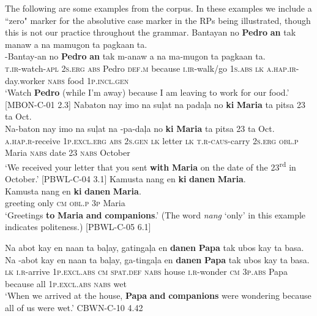  The following are some examples from the corpus. In these examples we include a ``zero" marker for the absolutive case marker in the RPs being illustrated, though this is not our practice throughout the grammar. 
\ea
Bantayan  no  \textbf{Pedro}  \textbf{an}  tak  manaw a  na  mamugon  ta  pagkaan  ta. \\\smallskip
 \gll \emptyset{}-Bantay-an  no   \emptyset {} \textbf{Pedro}  \textbf{an}  tak  m-anaw a  na  ma-mugon  ta  pagkaan  ta. \\
\textsc{t.ir}-watch-\textsc{apl}  2\textsc{s.erg}  \textsc{abs}  Pedro  \textsc{def.m}  because  \textsc{i.ir}-walk/go 1\textsc{s.abs}  \textsc{lk}  \textsc{a.hap.ir}-day.worker  \textsc{nabs}  food  1\textsc{p.incl.gen} \\
\glt `Watch \textbf{Pedro} (while I’m away) because I am leaving to work for our food.’ [MBON-C-01 2.3]
\z
\ea
Nabaton  nay imo  na  suļat  na  padaļa  no \textbf{ki}  \textbf{Maria}  ta  pitsa  23  ta  Oct. \\\smallskip
 \gll Na-baton  nay \emptyset{} imo  na  suļat  na  \emptyset{}-pa-daļa  no \textbf{ki}  \textbf{Maria}  ta  pitsa  23  ta  Oct. \\
\textsc{a.hap.r}-receive  1\textsc{p.excl.erg} \textsc{abs} 2\textsc{s.gen}  \textsc{lk}  letter  \textsc{lk}  \textsc{t.r-caus-}carry  2\textsc{s.erg} \textsc{obl.p}  Maria  \textsc{nabs}  date  23  \textsc{nabs}  October \\
\glt `We received your letter that you sent \textbf{with} \textbf{Maria} on the date of the 23\textsuperscript{rd} in October.’ [PBWL-C-04 3.1]
\z
\ea
\label{bkm:Ref53060834}
Kamusta  nang  en  \textbf{ki}  \textbf{danen}  \textbf{Maria}. \\\smallskip
 \gll Kamusta  nang  en  \textbf{ki}  \textbf{danen}  \textbf{Maria}. \\
greeting  only  \textsc{cm}  \textsc{obl.p}  \textsc{3p}  Maria \\
\glt ‘Greetings \textbf{to} \textbf{Maria} \textbf{and} \textbf{companions}.’ (The word \textit{nang} ‘only’ in this example indicates politeness.) [PBWL-C-05 6.1]
\z


\largerpage
\ea
\label{bkm:Ref343578640}
Na abot  kay  en  naan  ta  baļay, gatingaļa  en  \textbf{danen}  \textbf{Papa}  tak  ubos  kay  ta  basa. \\\smallskip
 \gll Na\footnotemark{}  \emptyset{}-abot  kay  en  naan  ta  baļay, ga-tingaļa  en  \textbf{danen}  \textbf{Papa}  tak  ubos  kay  ta  basa. \\
\textsc{lk}  \textsc{i.r-}arrive  1\textsc{p.excl.abs}  \textsc{cm}  \textsc{spat.def}  \textsc{nabs}  house \textsc{i.r-}wonder  \textsc{cm}  3\textsc{p.abs}  Papa  because  all  1\textsc{p.excl.abs}  \textsc{nabs}  wet \\
\glt `When we arrived at the house, \textbf{Papa} \textbf{and} \textbf{companions} were wondering because all of us were wet.’ CBWN-C-10 4.42
\z
